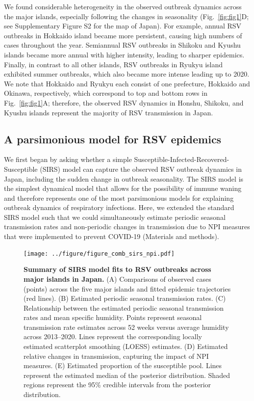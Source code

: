 \documentclass[12pt]{article}
\newcommand{\fref}[1]{Fig.~\ref{fig:#1}}
\begin{document}
We found considerable heterogeneity in the observed outbreak dynamics across the major islands, especially following the changes in seasonality (\fref{fig1}D; see Supplementary Figure S2 for the map of Japan).
For example, annual RSV outbreaks in Hokkaido island became more persistent, causing high numbers of cases throughout the year.
Semiannual RSV outbreaks in Shikoku and Kyushu islands became more annual with higher intensity, leading to sharper epidemics.
Finally, in contrast to all other islands, RSV outbreaks in Ryukyu island exhibited summer outbreaks, which also became more intense leading up to 2020.
We note that Hokkaido and Ryukyu each consist of one prefecture, Hokkaido and Okinawa, respectively, 
which correspond to top and bottom rows in \fref{fig1}A;
therefore, the observed RSV dynamics in Honshu, Shikoku, and Kyushu islands represent the majority of RSV transmission in Japan.

\subsection*{A parsimonious model for RSV epidemics}

We first began by asking whether a simple Susceptible-Infected-Recovered-Susceptible (SIRS) model can capture the observed RSV outbreak dynamics in Japan, including the sudden change in outbreak seasonality.
The SIRS model is the simplest dynamical model that allows for the possibility of immune waning and therefore represents one of the most parsimonious models for explaining outbreak dynamics of respiratory infections.
Here, we extended the standard SIRS model such that we could simultaneously estimate periodic seasonal transmission rates and non-periodic changes in transmission due to NPI measures that were implemented to prevent COVID-19 (Materials and methods).

\begin{figure}[!th]
\texttt{[image: ../figure/figure\_comb\_sirs\_npi.pdf]}
\caption{
\textbf{Summary of SIRS model fits to RSV outbreaks across major islands in Japan.}
(A) Comparisons of observed cases (points) across the five major islands and fitted epidemic trajectories (red lines).
(B) Estimated periodic seasonal transmission rates.
(C) Relationship between the estimated periodic seasonal transmission rates and mean specific humidity.
Points represent seasonal transmission rate estimates across 52 weeks versus average humidity across 2013--2020.
Lines represent the corresponding locally estimated scatterplot smoothing (LOESS) estimates.
(D) Estimated relative changes in transmission, capturing the impact of NPI measures.
(E) Estimated proportion of the susceptible pool.
Lines represent the estimated median of the posterior distribution.
Shaded regions represent the 95\% credible intervals from the posterior distribution.
}
\label{fig:fig2}
\end{figure}
\end{document}
